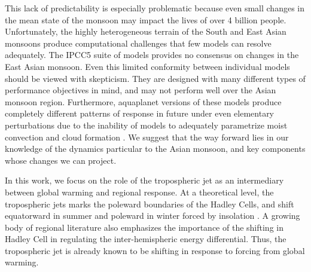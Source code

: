 	This lack of predictability is especially problematic because even small changes in the mean state of the monsoon may impact the lives of over 4 billion people. Unfortunately, the highly heterogeneous terrain of the South and East Asian monsoons produce computational challenges that few models can resolve adequately. The IPCC5 suite of models provides no consensus on changes in the East Asian monsoon. Even this limited conformity between individual models should be viewed with skepticism. They are designed with many different types of performance objectives in mind, and may not perform well over the Asian monsoon region. Furthermore, aquaplanet versions of these models produce completely different patterns of response in future under even elementary perturbations due to the inability of models to adequately parametrize moist convection and cloud formation \citep{Stevens2013}. We suggest that the way forward lies in our knowledge of the dynamics particular to the Asian monsoon, and key components whose changes we can project.

	In this work, we focus on the role of the tropospheric jet as an intermediary between global warming and regional response. At a theoretical level, the tropospheric jets marks the poleward boundaries of the Hadley Cells, and shift equatorward in summer and poleward in winter forced by insolation \citep{Bordoni2008}. A growing body of regional literature also emphasizes the importance of the shifting in Hadley Cell in regulating the inter-hemispheric energy differential. Thus, the tropospheric jet is already known to be shifting in response to forcing from global warming.


